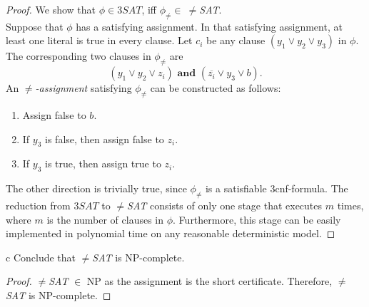 \documentclass[11pt]{article}
\begin{document}
\begin{proof}
We show that $\phi \in 3SAT$, iff $\phi_{\neq} \in \ \neq$\textit{SAT}. \\

Suppose that $\phi$ has a satisfying assignment. In that satisfying assignment, at least one literal is true in every clause. Let $c_i$ be any clause $(y_1 \vee y_2 \vee y_3)$ in $\phi$. The corresponding two clauses in $\phi_{\neq}$ are
\[
(y_1 \vee y_2 \vee z_i) \textbf{ and } (\overline{z_i} \vee y_3 \vee b).
\]
An $\neq$\textit{-assignment} satisfying $\phi_{\neq}$ can be constructed as follows:
\begin{enumerate}
\item Assign false to $b$.
\item If $y_3$ is false, then assign false to $z_i$.
\item If $y_3$ is true, then assign true to $z_i$.
\end{enumerate}

The other direction is trivially true, since $\phi_{\neq}$ is a satisfiable 3cnf-formula. The reduction from $3SAT$ to $\neq$\textit{SAT} consists of only one stage that executes $m$ times, where $m$ is the number of clauses in $\phi$. Furthermore, this stage can be easily implemented in polynomial time on any reasonable deterministic model.
\end{proof}

\begin{problem}[Part]{c}
Conclude that $\neq$\textit{SAT} is NP-complete.
\end{problem}

\begin{proof}
$\neq$\textit{SAT} $\in$ NP as the assignment is the short certificate. Therefore, $\neq$\textit{SAT} is NP-complete.
\end{proof}
\end{document}
